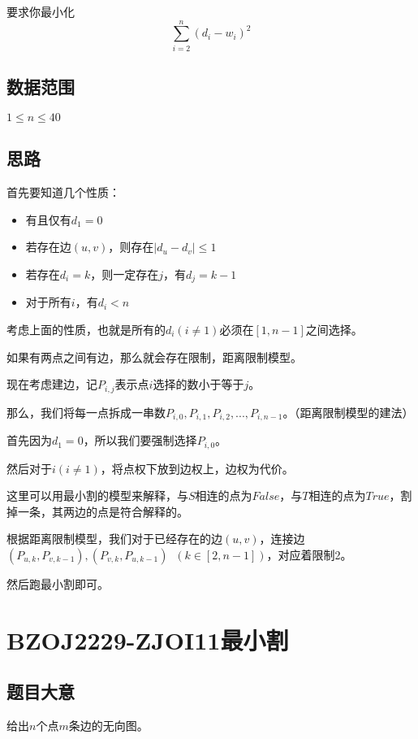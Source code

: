 \documentclass{ctexart}
\numberwithin{equation}{section}
\begin{document}
\begin{flushleft}
  要求你最小化$$\sum_{i=2}^n(d_i-w_i)^2$$
  
    
  \subsection{数据范围}
  $1\le n \le 40$
  \subsection{思路}
  首先要知道几个性质：

  \begin{itemize}
  \item 有且仅有$d_1 = 0$
  \item 若存在边$(u,v)$，则存在$|d_u-d_v| \le 1$
  \item 若存在$d_i=k$，则一定存在$j$，有$d_j=k-1$
  \item 对于所有$i$，有$d_i< n$
  \end{itemize}

  考虑上面的性质，也就是所有的$d_i(i \not = 1)$必须在$[1,n-1]$之间选择。

  如果有两点之间有边，那么就会存在限制，距离限制模型。

  现在考虑建边，记$P_{i,j}$表示点$i$选择的数小于等于$j$。

  那么，我们将每一点拆成一串数$P_{i,0},P_{i,1},P_{i,2},...,P_{i,n-1}$。（距离限制模型的建法）

  首先因为$d_1=0$，所以我们要强制选择$P_{i,0}$。

  然后对于$i(i \not = 1)$，将点权下放到边权上，边权为代价。

  这里可以用最小割的模型来解释，与$S$相连的点为$False$，与$T$相连的点为$True$，割掉一条，其两边的点是符合解释的。

  根据距离限制模型，我们对于已经存在的边$(u,v)$，连接边$(P_{u,k},P_{v,k-1}),(P_{v,k},P_{u,k-1})\;\;(k\in [2,n-1])$，对应着限制2。

  然后跑最小割即可。
  
  \newpage

  \section{BZOJ2229-ZJOI11最小割}
  \subsection{题目大意}
  给出$n$个点$m$条边的无向图。


\end{flushleft}
\end{document}
